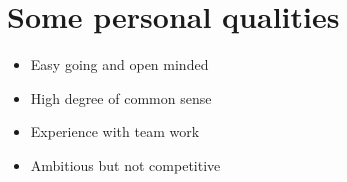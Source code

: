 \documentclass[12pt,a4paper]{article}
\begin{document}
\section*{Some personal qualities}
\begin{itemize} 
  \item Easy going and open minded
  \item High degree of common sense  
  \item Experience with team work
  \item Ambitious but not competitive
\end{itemize}

%
%
%  
\end{document}
